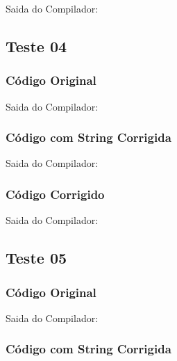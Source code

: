 Saida do Compilador:



\subsection{Teste 04}
\label{subsec:lexicoTeste04}

\subsubsection{Código Original}


Saida do Compilador:




\subsubsection{Código com String Corrigida}


Saida do Compilador:




\subsubsection{Código Corrigido}


Saida do Compilador:




\subsection{Teste 05}
\label{subsec:lexicoTeste05}

\subsubsection{Código Original}


Saida do Compilador:




\subsubsection{Código com String Corrigida}


